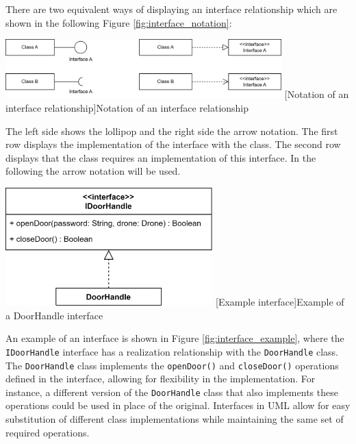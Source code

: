 \documentclass[
	12pt,
    a4paper,
    egregdoesnotlikesansseriftitles, %
    toc=chapterentrywithdots,
    oneside, openany,
    titlepage,
    parskip=half,
    headings=normal,  %
    listof=totoc,
    bibliography=totocnumbered,
    index=totoc,
    captions=tableheading,  %
    listof=flat,
    numbers=noenddot, %
    final]
    {scrbook}
\begin{document}
There are two equivalent ways of displaying an interface relationship which are shown in the following Figure \ref{fig:interface_notation}:

\begin{minipage}{\linewidth}
	\centering
	\includegraphics[width=0.8\textwidth]{figures/interface/Interface_Notation.jpg}
	[Notation of an interface relationship]{Notation of an interface relationship}
	\label{fig:interface_notation}
\end{minipage}

The left side shows the lollipop and the right side the arrow notation.
The first row displays the implementation of the interface with the class.
The second row displays that the class requires an implementation of this interface. \cite[p. 129]{uml}
In the following the arrow notation will be used.
                
\begin{minipage}{\linewidth}
	\centering
	\includegraphics[width=0.6\textwidth]{figures/interface/doorhandle_interface.jpg}
	[Example interface]{Example of a DoorHandle interface}
	\label{fig:interface_example}
\end{minipage}

An example of an interface is shown in Figure \ref{fig:interface_example}, where the \texttt{IDoorHandle} interface has a realization relationship with the \texttt{DoorHandle} class.
The \texttt{DoorHandle} class implements the \texttt{openDoor()} and \texttt{closeDoor()} operations defined in the interface, allowing for flexibility in the implementation.
For instance, a different version of the \texttt{DoorHandle} class that also implements these operations could be used in place of the original.
Interfaces in UML allow for easy substitution of different class implementations while maintaining the same set of required operations.
\end{document}
